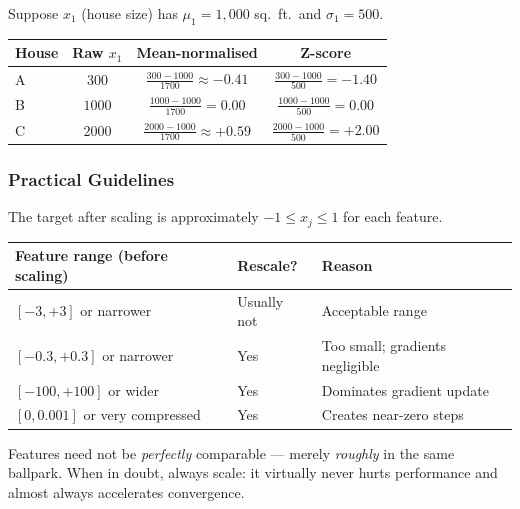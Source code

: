 \begin{example}
Suppose $x_1$ (house size) has $\mu_1=1{,}000$ sq.\ ft.\ and $\sigma_1=500$.

\begin{center}
\begin{tabular}{lccc}
\toprule
House & Raw $x_1$ & Mean-normalised & Z-score\\
\midrule
A & $300$  & $\frac{300-1000}{1700}\approx-0.41$ & $\frac{300-1000}{500}=-1.40$\\[4pt]
B & $1000$ & $\frac{1000-1000}{1700}=0.00$        & $\frac{1000-1000}{500}=0.00$\\[4pt]
C & $2000$ & $\frac{2000-1000}{1700}\approx+0.59$ & $\frac{2000-1000}{500}=+2.00$\\
\bottomrule
\end{tabular}
\end{center}
\end{example}

\subsubsection{Practical Guidelines}

The target after scaling is approximately $-1\le x_j\le 1$ for each feature.

\begin{center}
\begin{tabular}{lll}
\toprule
\textbf{Feature range (before scaling)} & \textbf{Rescale?} & \textbf{Reason}\\
\midrule
$[-3,+3]$ or narrower           & Usually not & Acceptable range\\
$[-0.3,+0.3]$ or narrower       & Yes         & Too small; gradients negligible\\
$[-100,+100]$ or wider           & Yes         & Dominates gradient update\\
$[0,0.001]$ or very compressed  & Yes         & Creates near-zero steps\\
\bottomrule
\end{tabular}
\end{center}

\begin{remark}
Features need not be \emph{perfectly} comparable — merely \emph{roughly} in
the same ballpark. When in doubt, always scale: it virtually never hurts
performance and almost always accelerates convergence.
\end{remark}

